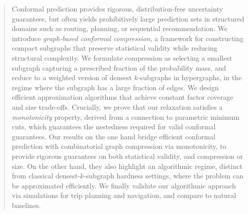 \begin{abstract}
Conformal prediction provides rigorous, distribution-free uncertainty guarantees, but often yields prohibitively large prediction sets in structured domains such as routing, planning, or sequential recommendation. We introduce \emph{graph-based conformal compression}, a framework for constructing compact subgraphs that preserve statistical validity while reducing structural complexity. We formulate compression as selecting a smallest subgraph capturing a prescribed fraction of the probability mass, and reduce to a weighted version of densest $k$-subgraphs in hypergraphs, in the regime where the subgraph has a large fraction of edges. We design efficient approximation algorithms that achieve constant factor coverage and size trade-offs. Crucially, we prove that our relaxation satisfies a \emph{monotonicity} property, derived from a connection to parametric minimum cuts, which guarantees the nestedness required for valid conformal guarantees. 
 Our results on the one hand bridge efficient conformal prediction with combinatorial graph compression via monotonicity, to provide rigorous guarantees on both statistical validity, and compression or size. On the other hand, they also highlight an algorithmic regime, distinct from classical densest-$k$-subgraph hardness settings, where the problem can be approximated efficiently. 
%
We finally validate our algorithmic approach via simulations for trip planning and navigation, and compare to natural baselines.
%



\end{abstract}